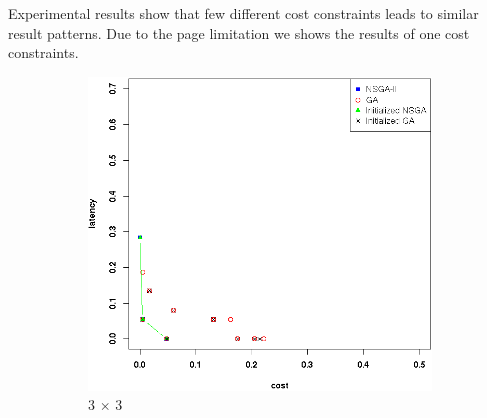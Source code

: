 \documentclass{llncs}
\begin{document}
Experimental results show that few different cost constraints leads to similar result patterns. Due to the page limitation we shows the results of one cost constraints.




\begin{figure}[H]
	\centering
	\begin{subfigure}[b]{0.45\textwidth}
		\includegraphics[width=\textwidth]{pics/pop_50_gen_50_3_times_3_sufficient_initialisation.png}
		\caption{3 $\times$ 3}
	\end{subfigure}%
	\begin{subfigure}[b]{0.45\textwidth}

\end{subfigure}
\end{figure}
\end{document}
